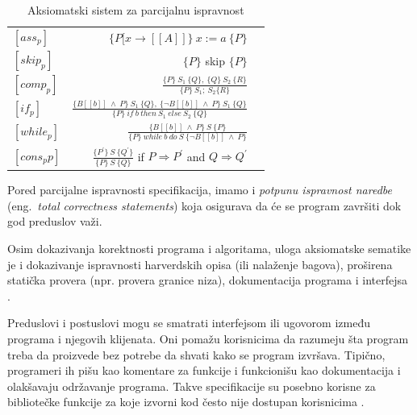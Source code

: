 \documentclass[a4paper]{article}
\begin{document}
{\begin{table}[h]
  \caption{Aksiomatski sistem za parcijalnu ispravnost}\label{tab:a}
    \begin{center}
        \begin{tabular}{lrc}\hline
        \hline
        \hline
        $[ass_{p}] $ & $ \{ P[x \rightarrow [\![A]\!]\} \ x:= a \ \{P\}$    \\  [6pt]
        $[skip_{p}] $ & $ \{P\}$ skip  $ \{P\}$   \\ [6pt]
         $[comp_{p}] $ & $  \frac{\{P\} \ S_1 \ \{Q\}, \ \{Q\} \ S_2 \ \{R\}}{\{P\} \ S_1; \ S_2\{R\}} $ \\[6pt]
            $[if_{p}] $ & $  \frac{\{B[\![b]\!] \ \land \ P\} \ S_1 \ \{Q\}, \ \{\neg B[\![b]\!] \ \land \ P\} \ S_1 \ \{Q\}}{\{P\} \  if \ b \ then \ S_1 \  else \ S_2 \ \{Q\}} $ \\ [6pt]
        $[while_{p}] $ & $  \frac{\{B[\![b]\!] \ \land \ P\} \ S \ \{P\}}{\{P\} \  while \ b \ do \ S \ \{\neg B[\![b]\!] \ \land \ P\}} $ \\ [6pt]
          $[cons_p{p}] $ & $  \frac{\{P^{'}\} \ S \ \{Q^{'}\}}{\{P\} \ S \ \{Q\}} $ if $ P \Rightarrow	 P^{'} $ and $ Q \Rightarrow	 Q^{'} $  \\ [6pt]
          \hline \hline
        \end{tabular}
    \end{center}
\end{table}






Pored parcijalne ispravnosti specifikacija, imamo i \textit {potpunu ispravnost naredbe } (eng.~{\em  total correctness statements}) koja osigurava da će se program završiti dok god preduslov važi.

Osim dokazivanja korektnosti programa i algoritama, uloga aksiomatske sematike je i dokazivanje ispravnosti harverdskih opisa (ili nalaženje bagova), proširena statička provera (npr. provera granice niza), dokumentacija programa i interfejsa  \cite{bec} . 

Preduslovi i postuslovi mogu se smatrati interfejsom ili ugovorom između programa i njegovih klijenata. Oni pomažu korisnicima da razumeju šta program treba da proizvede bez potrebe da shvati kako se program izvršava. Tipično, programeri ih pišu kao komentare za funkcije i
funkcionišu kao dokumentacija i olakšavaju održavanje programa. Takve specifikacije su posebno
korisne za bibliotečke funkcije za koje izvorni kod često nije dostupan korisnicima \cite{adrian}.

}
\end{document}
